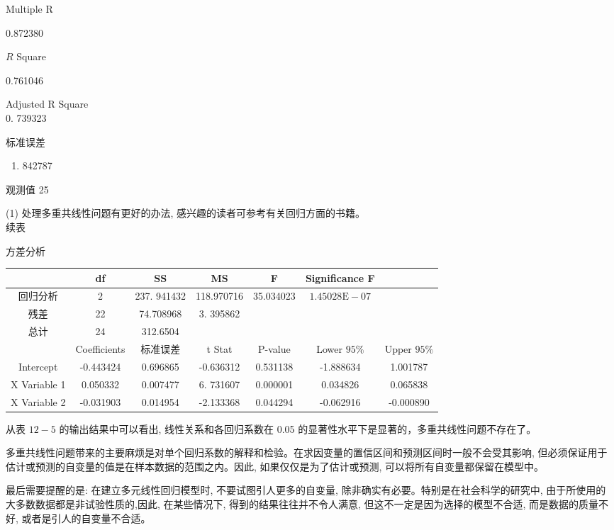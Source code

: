 \documentclass[10pt]{article}
\begin{document}
\begin{CJK*}{UTF8}{bsmi}
Multiple R

0.872380

$R$ Square

0.761046

Adjusted R Square\\
0. 739323

标准误差

\begin{enumerate}
  \item 842787
\end{enumerate}

观测值 25

(1) 处理多重共线性问题有更好的办法, 感兴趣的读者可参考有关回归方面的书籍。\\
续表

方差分析

\begin{center}
\begin{tabular}{|c|c|c|c|c|c|c|}
\hline
 & df & SS & MS & F & Significance F &  \\
\hline
回归分析 & 2 & 237. 941432 & 118.970716 & 35.034023 & $1.45028 \mathrm{E}-07$ &  \\
\hline
残差 & 22 & 74.708968 & 3. 395862 &  &  &  \\
\hline
\multirow[t]{2}{*}{总计} & 24 & 312.6504 &  &  &  &  \\
\hline
 & Coefficients & 标准误差 & t Stat & P-value & Lower $95 \%$ & Upper $95 \%$ \\
\hline
Intercept & -0.443424 & 0.696865 & -0.636312 & 0.531138 & -1.888634 & 1.001787 \\
\hline
X Variable 1 & 0.050332 & 0.007477 & 6. 731607 & 0.000001 & 0.034826 & 0.065838 \\
\hline
$\mathrm{X}$ Variable 2 & -0.031903 & 0.014954 & -2.133368 & 0.044294 & -0.062916 & -0.000890 \\
\hline
\end{tabular}
\end{center}

从表 $12-5$ 的输出结果中可以看出, 线性关系和各回归系数在 0.05 的显著性水平下是显著的，多重共线性问题不存在了。

多重共线性问题带来的主要麻烦是对单个回归系数的解释和检验。在求因变量的置信区间和预测区间时一般不会受其影响, 但必须保证用于估计或预测的自变量的值是在样本数据的范围之内。因此, 如果仅仅是为了估计或预测, 可以将所有自变量都保留在模型中。

最后需要提醒的是: 在建立多元线性回归模型时, 不要试图引人更多的自变量, 除非确实有必要。特别是在社会科学的研究中, 由于所使用的大多数数据都是非试验性质的,因此, 在某些情况下, 得到的结果往往并不令人满意, 但这不一定是因为选择的模型不合适, 而是数据的质量不好, 或者是引人的自变量不合适。


\end{CJK*}
\end{document}
